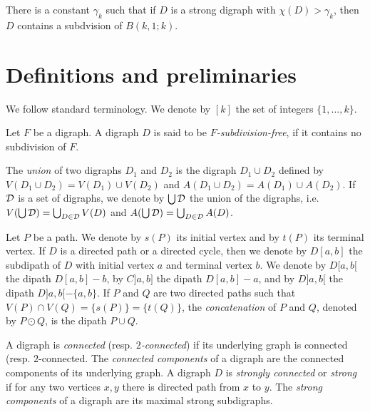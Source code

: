 \documentclass{endm}
\begin{document}
\begin{theorem}\label{th:main}
There is a constant $\gamma_k$ such that if $D$ is a strong digraph with $\chi(D) > \gamma_k$, then $D$ contains a subdvision of $B(k,1;k)$.
\end{theorem}

\section{Definitions and preliminaries}

We follow standard terminology. We denote by $[k]$ the set of integers $\{1, \dots , k\}$.


\smallskip

Let $F$ be a digraph.
A digraph $D$ is said to be {\it $F$-subdivision-free}, if it contains no subdivision of $F$.

\smallskip


The {\it union} of two digraphs $D_1$ and $D_2$ is the digraph  $D_1\cup D_2$ defined by $V(D_1\cup D_2) = V(D_1)\cup V(D_2)$ and 
$A(D_1\cup D_2) = A(D_1)\cup A(D_2)$.
If ${\cal D}$ is a set of digraphs, we denote by $\bigcup {\cal D}$ the union of the digraphs, i.e. $V(\bigcup {\cal D}) =\bigcup_{D\in {\cal D}} V(D)$
and $A(\bigcup {\cal D}) =\bigcup_{D\in {\cal D}} A(D)$.


\smallskip


Let $P$ be a path. We denote by $s(P)$ its initial vertex and by $t(P)$ its terminal vertex.
If $D$ is a directed path or a directed cycle, then we denote by $D[a,b]$ the subdipath of $D$ with initial vertex $a$ and terminal vertex $b$.
We denote by $D[a,b[$ the dipath $D[a,b] -b$, by $C]a,b]$ the dipath $D[a,b] -a$, and by $D]a,b[$ the dipath $D]a,b[ -\{a,b\}$.
If $P$ and $Q$ are two directed paths such that $V(P)\cap V(Q) =\{s(P)\}=\{t(Q)\}$, the {\it concatenation} of $P$ and $Q$, denoted by $P\odot Q$, is the dipath $P\cup Q$. 

\smallskip


A digraph is {\it connected} (resp. {\it $2$-connected}) if its underlying graph is connected (resp. $2$-connected.
The {\it connected components} of a digraph are the connected components of its underlying graph.
A digraph $D$ is {\it strongly connected} or {\it strong} if for any two vertices $x,y$ there is directed path from $x$ to $y$.
The {\it strong components} of a digraph are its maximal strong subdigraphs.
\end{document}
